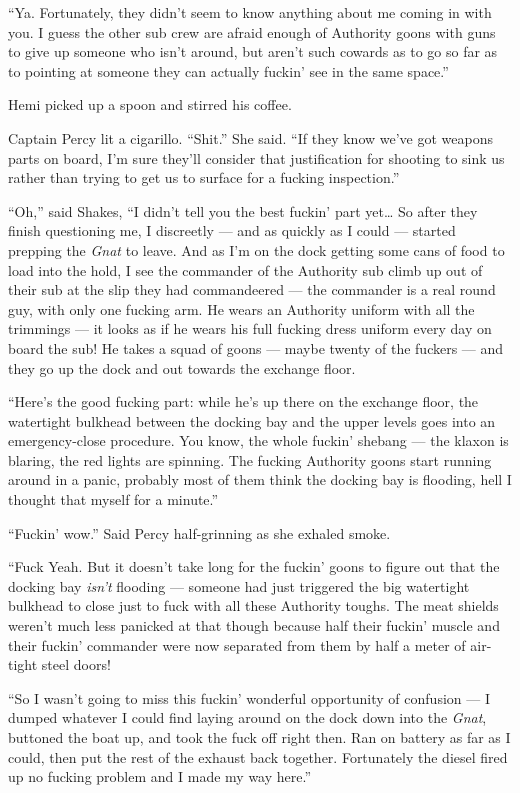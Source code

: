 \documentclass[
]{scrbook}
\begin{document}
``Ya. Fortunately, they didn't seem to know anything about me coming in
with you. I guess the other sub crew are afraid enough of Authority
goons with guns to give up someone who isn't around, but aren't such
cowards as to go so far as to pointing at someone they can actually
fuckin' see in the same space.''

Hemi picked up a spoon and stirred his coffee.

Captain Percy lit a cigarillo. ``Shit.'' She said. ``If they know we've
got weapons parts on board, I'm sure they'll consider that justification
for shooting to sink us rather than trying to get us to surface for a
fucking inspection.''

``Oh,'' said Shakes, ``I didn't tell you the best fuckin' part
yet\ldots{} So after they finish questioning me, I discreetly --- and as
quickly as I could --- started prepping the \emph{Gnat} to leave. And as
I'm on the dock getting some cans of food to load into the hold, I see
the commander of the Authority sub climb up out of their sub at the slip
they had commandeered --- the commander is a real round guy, with only
one fucking arm. He wears an Authority uniform with all the trimmings
--- it looks as if he wears his full fucking dress uniform every day on
board the sub! He takes a squad of goons --- maybe twenty of the fuckers
--- and they go up the dock and out towards the exchange floor.

``Here's the good fucking part: while he's up there on the exchange
floor, the watertight bulkhead between the docking bay and the upper
levels goes into an emergency-close procedure. You know, the whole
fuckin' shebang --- the klaxon is blaring, the red lights are spinning.
The fucking Authority goons start running around in a panic, probably
most of them think the docking bay is flooding, hell I thought that
myself for a minute.''

``Fuckin' wow.'' Said Percy half-grinning as she exhaled smoke.

``Fuck Yeah. But it doesn't take long for the fuckin' goons to figure
out that the docking bay \emph{isn't} flooding --- someone had just
triggered the big watertight bulkhead to close just to fuck with all
these Authority toughs. The meat shields weren't much less panicked at
that though because half their fuckin' muscle and their fuckin'
commander were now separated from them by half a meter of air-tight
steel doors!

``So I wasn't going to miss this fuckin' wonderful opportunity of
confusion --- I dumped whatever I could find laying around on the dock
down into the \emph{Gnat}, buttoned the boat up, and took the fuck off
right then. Ran on battery as far as I could, then put the rest of the
exhaust back together. Fortunately the diesel fired up no fucking
problem and I made my way here.''
\end{document}
